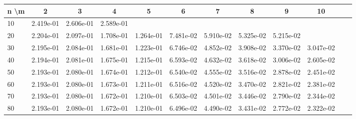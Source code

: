 \begin{table}[H]
\centering
\scriptsize
\setlength{\tabcolsep}{2pt}
\begin{tabular}{|l|ccccccccccc||}
\hline
n \textbackslash m & 2 & 3 & 4 & 5 & 6 & 7 & 8 & 9 & 10 \\\hline
10 & \cellcolor{Orange!92}2.419e-01 & \cellcolor{Orange!100}2.606e-01 & \cellcolor{Orange!99}2.589e-01 \\
20 & \cellcolor{Orange!83}2.204e-01 & \cellcolor{Orange!78}2.097e-01 & \cellcolor{Orange!62}1.708e-01 & \cellcolor{Orange!43}1.264e-01 & \cellcolor{Orange!21}7.481e-02 & \cellcolor{Orange!15}5.910e-02 & \cellcolor{Orange!12}5.325e-02 & \cellcolor{Orange!12}5.215e-02 \\
30 & \cellcolor{Orange!82}2.195e-01 & \cellcolor{Orange!78}2.084e-01 & \cellcolor{Orange!61}1.681e-01 & \cellcolor{Orange!41}1.223e-01 & \cellcolor{Orange!18}6.746e-02 & \cellcolor{Orange!10}4.852e-02 & \cellcolor{Orange!6}3.908e-02 & \cellcolor{Orange!4}3.370e-02 & \cellcolor{Orange!3}3.047e-02 \\
40 & \cellcolor{Orange!82}2.194e-01 & \cellcolor{Orange!77}2.081e-01 & \cellcolor{Orange!60}1.675e-01 & \cellcolor{Orange!41}1.215e-01 & \cellcolor{Orange!18}6.593e-02 & \cellcolor{Orange!9}4.632e-02 & \cellcolor{Orange!5}3.618e-02 & \cellcolor{Orange!2}3.006e-02 & \cellcolor{Orange!1}2.605e-02 \\
50 & \cellcolor{Orange!82}2.193e-01 & \cellcolor{Orange!77}2.080e-01 & \cellcolor{Orange!60}1.674e-01 & \cellcolor{Orange!41}1.212e-01 & \cellcolor{Orange!17}6.540e-02 & \cellcolor{Orange!9}4.555e-02 & \cellcolor{Orange!5}3.516e-02 & \cellcolor{Orange!2}2.878e-02 & \cellcolor{Orange!0}2.451e-02 \\
60 & \cellcolor{Orange!82}2.193e-01 & \cellcolor{Orange!77}2.080e-01 & \cellcolor{Orange!60}1.673e-01 & \cellcolor{Orange!41}1.211e-01 & \cellcolor{Orange!17}6.516e-02 & \cellcolor{Orange!9}4.520e-02 & \cellcolor{Orange!4}3.470e-02 & \cellcolor{Orange!2}2.821e-02 & \cellcolor{Orange!0}2.381e-02 \\
70 & \cellcolor{Orange!82}2.193e-01 & \cellcolor{Orange!77}2.080e-01 & \cellcolor{Orange!60}1.672e-01 & \cellcolor{Orange!41}1.210e-01 & \cellcolor{Orange!17}6.503e-02 & \cellcolor{Orange!9}4.501e-02 & \cellcolor{Orange!4}3.446e-02 & \cellcolor{Orange!2}2.790e-02 & \cellcolor{Orange!0}2.344e-02 \\
80 & \cellcolor{Orange!82}2.193e-01 & \cellcolor{Orange!77}2.080e-01 & \cellcolor{Orange!60}1.672e-01 & \cellcolor{Orange!41}1.210e-01 & \cellcolor{Orange!17}6.496e-02 & \cellcolor{Orange!9}4.490e-02 & \cellcolor{Orange!4}3.431e-02 & \cellcolor{Orange!1}2.772e-02 & \cellcolor{Orange!0}2.322e-02 \\

\end{tabular}
\end{table}
